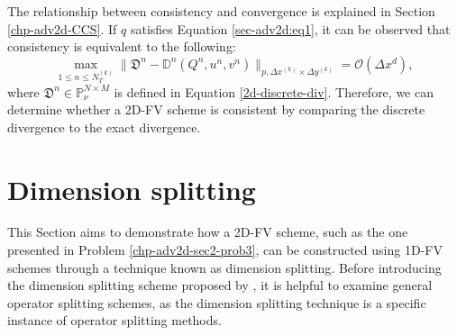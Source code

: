 The relationship between consistency and convergence is explained in Section \ref{chp-adv2d-CCS}.
If $q$ satisfies Equation \eqref{sec-adv2d:eq1}, it can be observed that consistency is equivalent to the following:
\begin{equation*}
	{\max_{1\leq n\leq N_T^{(k)}}}{\|\mathfrak{D}^n - \mathbb{D}^n(Q^n,u^n,v^n)\|_{p,\Delta x^{(k)} \times \Delta y^{(k)}}} = \mathcal{O}(\Delta x^d),
\end{equation*}
where $\mathfrak{D}^n \in \mathbb{P}^{N\times M}_{\nu}$ is defined in Equation \eqref{2d-discrete-div}.
Therefore, we can determine whether a 2D-FV scheme is consistent by comparing the discrete divergence to the exact divergence.

\section{Dimension splitting}
\label{sec-dsplit}
This Section aims to demonstrate how a 2D-FV scheme, such as the one presented in Problem \ref{chp-adv2d-sec2-prob3},
can be constructed using 1D-FV schemes through a technique known as dimension splitting.
Before introducing the dimension splitting scheme proposed by \citet{lin:1996},
it is helpful to examine general operator splitting schemes,
as the dimension splitting technique is a specific instance of operator splitting methods.

